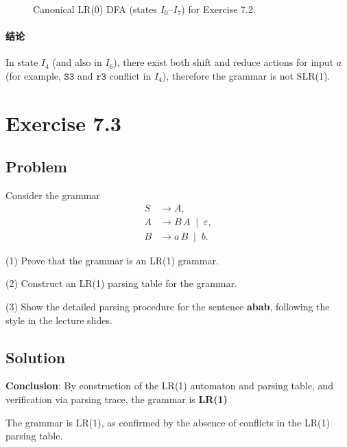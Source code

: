 \begin{figure}[htbp]
\caption{Canonical LR(0) DFA (states $I_0$--$I_7$) for Exercise 7.2.}
\end{figure}

\newpage
\paragraph{结论}
In state $I_4$ (and also in $I_6$), there exist both shift and reduce actions for input $a$ (for example, $\texttt{S3}$ and $\texttt{r3}$ conflict in $I_4$), therefore the grammar is not SLR(1).
\newpage
\section{Exercise 7.3}
\subsection{Problem}
Consider the grammar
\[
\begin{aligned}
S &\to A, \\
A &\to B\,A \;\mid\; \varepsilon, \\
B &\to a\,B \;\mid\; b.
\end{aligned}
\]

(1) Prove that the grammar is an LR(1) grammar.

(2) Construct an LR(1) parsing table for the grammar.

(3) Show the detailed parsing procedure for the sentence \textbf{abab}, following the style in the lecture slides.

\subsection{Solution}

\textbf{Conclusion}:  
By construction of the LR(1) automaton and parsing table, and verification via parsing trace, the grammar is \textbf{LR(1)}

The grammar is LR(1), as confirmed by the absence of conflicts in the LR(1) parsing table.


